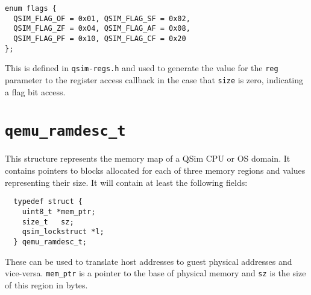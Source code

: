 \documentclass[letterpaper, 10pt]{book}
\begin{document}
\begin{verbatim}
enum flags {
  QSIM_FLAG_OF = 0x01, QSIM_FLAG_SF = 0x02,
  QSIM_FLAG_ZF = 0x04, QSIM_FLAG_AF = 0x08,
  QSIM_FLAG_PF = 0x10, QSIM_FLAG_CF = 0x20
};
\end{verbatim}

This is defined in \texttt{qsim-regs.h} and used to generate the value for the
\texttt{reg} parameter to the register access callback in the case that
\texttt{size} is zero, indicating a flag bit access.

\section{\texttt{qemu\_ramdesc\_t}} \label{struct:qemu_ramdesc_t}
This structure represents the memory map of a QSim CPU or OS domain. It
contains pointers to blocks allocated for each of three memory regions and
values representing their size. It will contain at least the following fields:

\begin{verbatim}
  typedef struct {
    uint8_t *mem_ptr;
    size_t   sz;
    qsim_lockstruct *l;
  } qemu_ramdesc_t;
\end{verbatim}

These can be used to translate host addresses to guest physical addresses and 
vice-versa. \texttt{mem\_ptr} is a pointer to the base of physical memory and
\texttt{sz} is the size of this region in bytes.

\newpage
\end{document}
